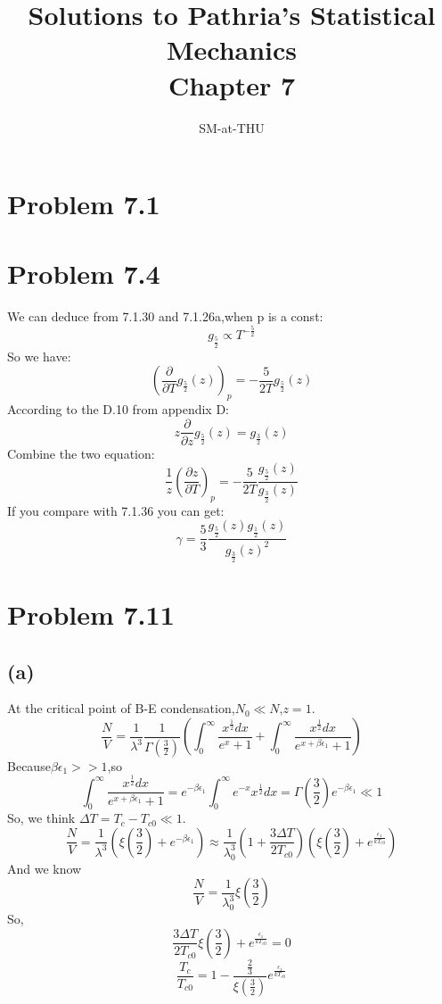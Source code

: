 \documentclass{article}
\author{SM-at-THU}
\title{\bf{Solutions to Pathria's Statistical Mechanics}\\Chapter 7}
\begin{document}
\maketitle
\section*{Problem 7.1}

\section*{Problem 7.4}
We can deduce from 7.1.30 and 7.1.26a,when p is a const:
$$g_{\frac{5}{2}}\propto T^{-\frac{5}{2}}$$
So we have:
$$(\frac{\partial}{\partial T}{g_{\frac{5}{2}}(z)})_p=-\frac{5}{2T}  g_{\frac{5}{2}}(z)$$
According to the D.10 from appendix D:
$$z\frac{\partial}{\partial z}g_{\frac{5}{2}}(z)=g_{\frac{3}{2}}(z)$$
Combine the two equation:
$$\frac{1}{z}(\frac{\partial z}{\partial T})_p=-\frac{5}{2T}\frac{g_{\frac{5}{2}}(z)}{g_{\frac{3}{2}}(z)}$$
If you compare with 7.1.36 you can get:
$$\gamma=\frac{5}{3}\frac{g_{\frac{5}{2}}(z)g_{\frac{1}{2}}(z)}{g_{\frac{3}{2}}(z)^2}$$

\section*{Problem 7.11}
\subsection*{(a)}
At the critical point of B-E condensation,$N_0 \ll N$,$z=1$.
\begin{equation}
\frac{N}{V} = \frac{1}{\lambda^3} \frac{1}{\Gamma(\frac{3}{2})} (\int_0^{\infty} \frac{x^{\frac{1}{2}}dx}{e^x+1} + \int_0^{\infty} \frac{x^{\frac{1}{2}}dx}{e^{x+\beta \epsilon_1}+1})
\end{equation}
Because$\beta \epsilon_1 >> 1$,so 
\begin{equation}
\int_0^{\infty} \frac{x^{\frac{1}{2}}dx}{e^{x+\beta \epsilon_1}+1}= e^{-\beta \epsilon_1}
\int_0^{\infty} e^{-x} x^{\frac{1}{2}} dx = \Gamma(\frac{3}{2}) e^{-\beta \epsilon_1} \ll 1
\end{equation}
So, we think $\Delta T = T_c-T_{c0} \ll 1$.
\begin{equation}
\frac{N}{V} = \frac{1}{\lambda^3} (\xi(\frac{3}{2})+e^{-\beta \epsilon_1})
\approx \frac{1}{\lambda_0^3} (1+\frac{3\Delta T}{2 T_{c0}})(\xi(\frac{3}{2})+e^{\frac{\epsilon_1}{kT_{c0}}})
\end{equation}
And we know
\begin{equation}
\frac{N}{V} = \frac{1}{\lambda_0^3} \xi(\frac{3}{2})
\end{equation}
So,
\begin{equation}
\frac{3\Delta T}{2 T_{c0}} \xi(\frac{3}{2}) + e^{\frac{\epsilon_1}{kT_{c0}}} =0
\end{equation}
\begin{equation}
\frac{T_c}{T_{c0}} = 1 -  \frac{\frac{2}{3}}{\xi(\frac{3}{2})} e^{\frac{\epsilon_1}{kT_{c0}}}
\end{equation}
\end{document}
